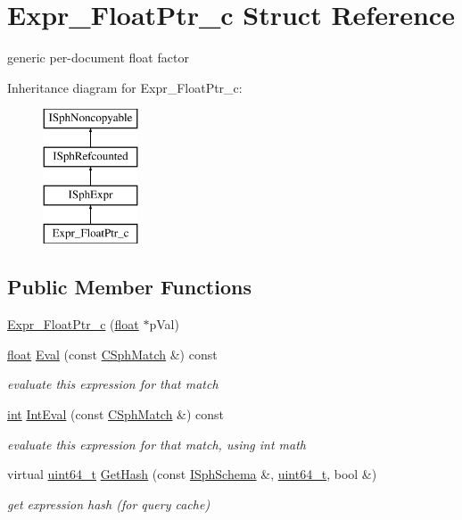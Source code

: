 \hypertarget{structExpr__FloatPtr__c}{\section{Expr\-\_\-\-Float\-Ptr\-\_\-c Struct Reference}
\label{structExpr__FloatPtr__c}
}


generic per-\/document float factor  


Inheritance diagram for Expr\-\_\-\-Float\-Ptr\-\_\-c\-:\begin{figure}[H]
\begin{center}
\leavevmode
\includegraphics[height=4.000000cm]{structExpr__FloatPtr__c}
\end{center}
\end{figure}
\subsection*{Public Member Functions}
\begin{DoxyCompactItemize}
\item 
\hyperlink{structExpr__FloatPtr__c_a6df671b6e23360eb8ceb63903e74d83c}{Expr\-\_\-\-Float\-Ptr\-\_\-c} (\hyperlink{sphinxexpr_8cpp_a0e0d0739f7035f18f949c2db2c6759ec}{float} $\ast$p\-Val)
\item 
\hyperlink{sphinxexpr_8cpp_a0e0d0739f7035f18f949c2db2c6759ec}{float} \hyperlink{structExpr__FloatPtr__c_ab116ed7c231b6ddb554091e0b4ff657c}{Eval} (const \hyperlink{classCSphMatch}{C\-Sph\-Match} \&) const 
\begin{DoxyCompactList}\small\item\em evaluate this expression for that match \end{DoxyCompactList}\item 
\hyperlink{sphinxexpr_8cpp_a4a26e8f9cb8b736e0c4cbf4d16de985e}{int} \hyperlink{structExpr__FloatPtr__c_a4066751afaf3f56c56b17a84dd295016}{Int\-Eval} (const \hyperlink{classCSphMatch}{C\-Sph\-Match} \&) const 
\begin{DoxyCompactList}\small\item\em evaluate this expression for that match, using int math \end{DoxyCompactList}\item 
virtual \hyperlink{sphinxstd_8h_aaa5d1cd013383c889537491c3cfd9aad}{uint64\-\_\-t} \hyperlink{structExpr__FloatPtr__c_a6a58d3b7508a11be4878bde237813921}{Get\-Hash} (const \hyperlink{classISphSchema}{I\-Sph\-Schema} \&, \hyperlink{sphinxstd_8h_aaa5d1cd013383c889537491c3cfd9aad}{uint64\-\_\-t}, bool \&)
\begin{DoxyCompactList}\small\item\em get expression hash (for query cache) \end{DoxyCompactList}\end{DoxyCompactItemize}
